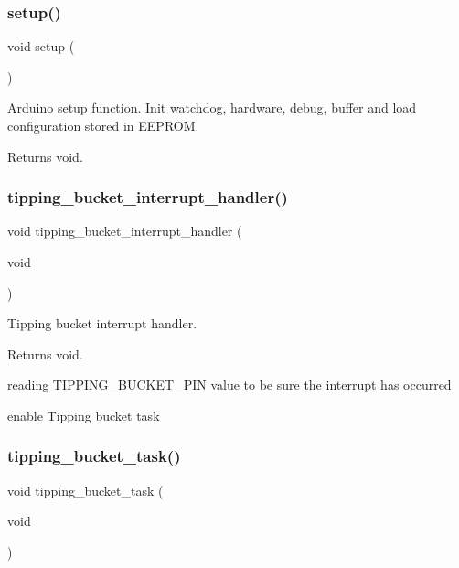 \subsubsection{\texorpdfstring{setup()}{setup()}}
{\footnotesize\ttfamily void setup (\begin{DoxyParamCaption}{ }\end{DoxyParamCaption})}



Arduino setup function. Init watchdog, hardware, debug, buffer and load configuration stored in E\+E\+P\+R\+OM. 

\begin{DoxyReturn}{Returns}
void. 
\end{DoxyReturn}
\mbox{\label{i2c-rain_8ino_a368e45fb147aecb0fd1478d3cc76fba7}} 
\subsubsection{\texorpdfstring{tipping\+\_\+bucket\+\_\+interrupt\+\_\+handler()}{tipping\_bucket\_interrupt\_handler()}}
{\footnotesize\ttfamily void tipping\+\_\+bucket\+\_\+interrupt\+\_\+handler (\begin{DoxyParamCaption}\item[{void}]{ }\end{DoxyParamCaption})}



Tipping bucket interrupt handler. 

\begin{DoxyReturn}{Returns}
void. 
\end{DoxyReturn}
reading T\+I\+P\+P\+I\+N\+G\+\_\+\+B\+U\+C\+K\+E\+T\+\_\+\+P\+IN value to be sure the interrupt has occurred

enable Tipping bucket task \mbox{\label{i2c-rain_8ino_a009edfb36e6432603ed0ede845e2c12d}} 
\subsubsection{\texorpdfstring{tipping\+\_\+bucket\+\_\+task()}{tipping\_bucket\_task()}}
{\footnotesize\ttfamily void tipping\+\_\+bucket\+\_\+task (\begin{DoxyParamCaption}\item[{void}]{ }\end{DoxyParamCaption})}



